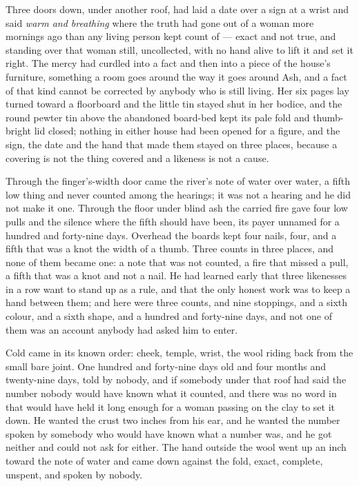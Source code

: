 Three doors down, under another roof,  had laid a date over a sign at a wrist and said \emph{warm and breathing} where the truth had gone out of a woman more mornings ago than any living person kept count of --- exact and not true, and standing over that woman still, uncollected, with no hand alive to lift it and set it right. The mercy had curdled into a fact and then into a piece of the house's furniture, something a room goes around the way it goes around Ash, and a fact of that kind cannot be corrected by anybody who is still living. Her six pages lay turned toward a floorboard and the little tin stayed shut in her bodice, and the round pewter tin above the abandoned board-bed kept its pale fold and thumb-bright lid closed; nothing in either house had been opened for a figure, and the sign, the date and the hand that made them stayed on three places, because a covering is not the thing covered and a likeness is not a cause.

\scenebreak

Through the finger's-width door came the river's note of water over water, a fifth low thing and never counted among the hearings; it was not a hearing and he did not make it one. Through the floor under blind ash the carried fire gave four low pulls and the silence where the fifth should have been, its payer unnamed for a hundred and forty-nine days. Overhead the boards kept four nails, four, and a fifth that was a knot the width of a thumb. Three counts in three places, and none of them became one: a note that was not counted, a fire that missed a pull, a fifth that was a knot and not a nail. He had learned early that three likenesses in a row want to stand up as a rule, and that the only honest work was to keep a hand between them; and here were three counts, and nine stoppings, and a sixth colour, and a sixth shape, and a hundred and forty-nine days, and not one of them was an account anybody had asked him to enter.

Cold came in its known order: cheek, temple, wrist, the wool riding back from the small bare joint. One hundred and forty-nine days old and four months and twenty-nine days, told by nobody, and if somebody under that roof had said the number nobody would have known what it counted, and there was no word in  that would have held it long enough for a woman passing on the clay to set it down. He wanted the crust two inches from his ear, and he wanted the number spoken by somebody who would have known what a number was, and he got neither and could not ask for either. The hand outside the wool went up an inch toward the note of water and came down against the fold, exact, complete, unspent, and spoken by nobody.

